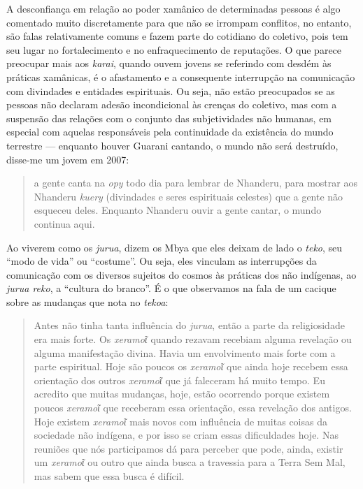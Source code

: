 A desconfiança em relação ao poder xamânico de determinadas pessoas é
algo comentado muito discretamente para que não se irrompam conflitos,
no entanto, são falas relativamente comuns e fazem parte do cotidiano do
coletivo, pois tem seu lugar no fortalecimento e no enfraquecimento de
reputações. O que parece preocupar mais aos \emph{karai}, quando ouvem
jovens se referindo com desdém às práticas xamânicas, é o afastamento e
a consequente interrupção na comunicação com divindades e entidades
espirituais. Ou seja, não estão preocupados se as pessoas não declaram
adesão incondicional às crenças do coletivo, mas com a suspensão das
relações com o conjunto das subjetividades não humanas, em especial com
aquelas responsáveis pela continuidade da existência do mundo terrestre
--- enquanto houver Guarani cantando, o mundo não será destruído,
disse-me um jovem em 2007:

\begin{quote}
a gente canta na \emph{opy} todo dia para lembrar de Nhanderu, para
mostrar aos Nhanderu \emph{kuery} (divindades e seres espirituais
celestes) que a gente não esqueceu deles. Enquanto Nhanderu ouvir a
gente cantar, o mundo continua aqui.
\end{quote}

Ao viverem como os \emph{jurua}, dizem os Mbya que eles deixam de lado o
\emph{teko}, seu ``modo de vida'' ou ``costume''. Ou seja, eles vinculam
as interrupções da comunicação com os diversos sujeitos do cosmos às
práticas dos não indígenas, ao \emph{jurua reko}, a ``cultura do
branco''. É o que observamos na fala de um cacique sobre as mudanças que
nota no \emph{tekoa}:

\begin{quote}
Antes não tinha tanta influência do \emph{jurua}, então a parte da
religiosidade era mais forte. Os \emph{xeramoῖ} quando rezavam recebiam
alguma revelação ou alguma manifestação divina. Havia um envolvimento
mais forte com a parte espiritual. Hoje são poucos os \emph{xeramoῖ} que
ainda hoje recebem essa orientação dos outros \emph{xeramoῖ} que já
faleceram há muito tempo. Eu acredito que muitas mudanças, hoje, estão
ocorrendo porque existem poucos \emph{xeramoῖ} que receberam essa
orientação, essa revelação dos antigos. Hoje existem \emph{xeramoῖ} mais
novos com influência de muitas coisas da sociedade não indígena, e por
isso se criam essas dificuldades hoje. Nas reuniões que nós participamos
dá para perceber que pode, ainda, existir um \emph{xeramoῖ} ou outro que
ainda busca a travessia para a Terra Sem Mal, mas sabem que essa busca é
difícil.
\end{quote}

